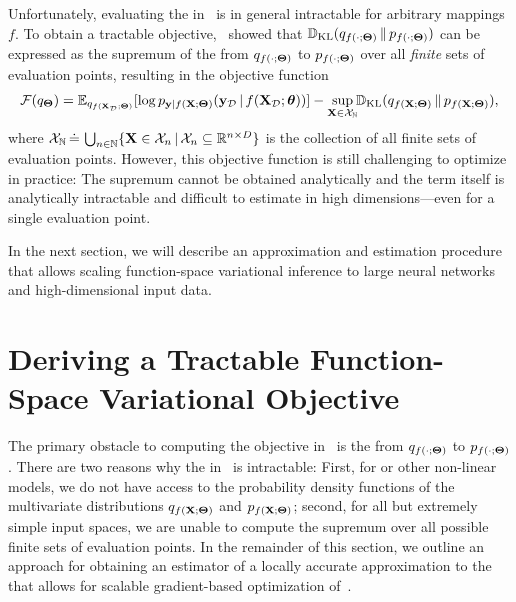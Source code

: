 Unfortunately, evaluating the \kld in~ is in general intractable for arbitrary mappings $f$.
To obtain a tractable objective,~\citet{sun2019fbnn} showed that $\mathbb{D}_\textrm{KL}(q_{f(\cdot ; \boldsymbol{\Theta})} \,\|\, p_{f(\cdot ; \boldsymbol{\Theta})})$ can be expressed as the supremum of the \kld from $q_{f(\cdot ; \boldsymbol{\Theta})}$ to $p_{f(\cdot ; \boldsymbol{\Theta})}$ over all \emph{finite} sets of evaluation points, resulting in the objective function
\begin{align}
\begin{split}
\label{eq:kld_fbnn}
    \mathcal{F}(q_{\boldsymbol{\Theta}})
    =
    \mathbb{E}_{q_{f(\mathbf X_{\mathcal{D}} ; \boldsymbol{\Theta})}}[\log p_{\mathbf y | f(\mathbf X ; \boldsymbol{\Theta})}(\mathbf y_{\mathcal{D}} \,|\, f(\mathbf X_{\mathcal{D}} ; {\boldsymbol{\theta}} ))]
    - \sup_{\mathbf X \in \mathcal{X}_{\mathbb{N}}} \hspace*{-3pt}\mathbb{D}_\textrm{KL}(q_{f(\mathbf X ; \boldsymbol{\Theta})} \,\|\, p_{f(\mathbf X ; \boldsymbol{\Theta})} ) ,
\end{split}
\end{align}%
where $\mathcal{X}_{\mathbb{N}} \,\dot{=}\, \bigcup_{n \in \mathbb{N}} \{ \mathbf X \in \mathcal{X}_{n} \,|\, \mathcal{X}_{n} \subseteq \mathbb{R}^{n \times D} \}$ is the collection of all finite sets of evaluation points.
However, this objective function is still challenging to optimize in practice:
The supremum cannot be obtained analytically and the \kld term itself is analytically intractable and difficult to estimate in high dimensions---even for a single evaluation point.
%
%
%

In the next section, we will describe an approximation and estimation procedure that allows scaling function-space variational inference to large neural networks and high-dimensional input data.

%
%
%
%
%



%

%
%
%
%
%
%
%
%
%
%
%
%
%

%
%
%

%
%
%
%
%

%
%
%
%
%

%
%
%
%

%



%
\section{Deriving a Tractable Function-Space Variational Objective}
\label{sec:fsvi_linearization}

The primary obstacle to computing the objective in~ is the \kld from $q_{f(\cdot ; \boldsymbol{\Theta})}$ to $p_{f(\cdot ; \boldsymbol{\Theta})}$.
There are two reasons why the \kld in~ is intractable:
First, for \bnns or other non-linear models, we do not have access to the probability density functions of the multivariate distributions $q_{f(\mathbf X ; \boldsymbol{\Theta})}$ and $p_{f(\mathbf X ; \boldsymbol{\Theta})}$;
second, for all but extremely simple input spaces, we are unable to compute the supremum over all possible finite sets of evaluation points.
In the remainder of this section, we outline an approach for obtaining an estimator of a locally accurate approximation to the \kld that allows for scalable gradient-based optimization of~.

